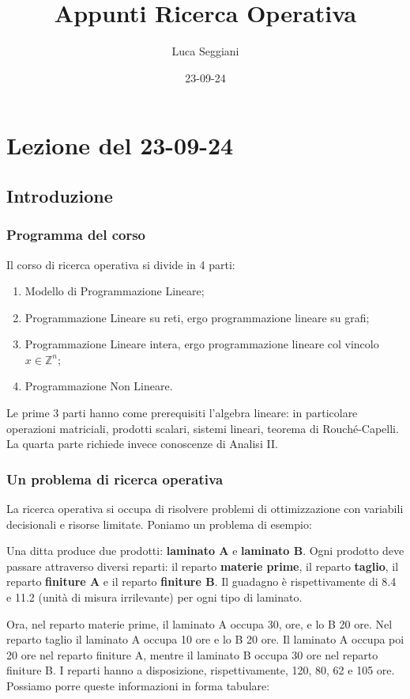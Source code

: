 \documentclass[a4paper,11pt]{article}
\title{Appunti Ricerca Operativa}
\author{Luca Seggiani}
\date{23-09-24}
\begin{document}
\section{Lezione del 23-09-24}

\thispagestyle{empty}
\pagestyle{fancy}

\subsection{Introduzione}

\subsubsection{Programma del corso}
Il corso di ricerca operativa si divide in 4 parti:

\begin{enumerate}
	\item Modello di Programmazione Lineare;
	\item Programmazione Lineare su reti, ergo programmazione lineare su grafi;
	\item Programmazione Lineare intera, ergo programmazione lineare col vincolo $x \in \mathbb{Z}^n$;
	\item Programmazione Non Lineare.
\end{enumerate}

Le prime 3 parti hanno come prerequisiti l'algebra lineare: in particolare operazioni matriciali, prodotti scalari, sistemi lineari, teorema di Rouché-Capelli.
La quarta parte richiede invece conoscenze di Analisi II.

\subsubsection{Un problema di ricerca operativa}
La ricerca operativa si occupa di risolvere problemi di ottimizzazione con variabili decisionali e risorse limitate.
Poniamo un problema di esempio:

Una ditta produce due prodotti: \textbf{laminato A} e \textbf{laminato B}.
Ogni prodotto deve passare attraverso diversi reparti: il reparto \textbf{materie prime}, il reparto \textbf{taglio}, il reparto \textbf{finiture A} e il reparto \textbf{finiture B}.
Il guadagno è rispettivamente di 8.4 e 11.2 (unità di misura irrilevante) per ogni tipo di laminato.

Ora, nel reparto materie prime, il laminato A occupa 30, ore, e lo B 20 ore.
Nel reparto taglio il laminato A occupa 10 ore e lo B 20 ore.
Il laminato A occupa poi 20 ore nel reparto finiture A, mentre il laminato B occupa 30 ore nel reparto finiture B.
I reparti hanno a disposizione, rispettivamente, 120, 80, 62 e 105 ore.
Possiamo porre queste informazioni in forma tabulare:
\end{document}
